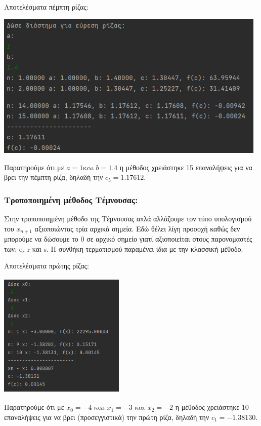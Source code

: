\documentclass{article}
\begin{document}
    \vspace{3mm}
    Αποτελέσματα πέμπτη ρίζας: \\
    \begin{center}\includegraphics[height = 7cm]{images/results_16.png}\end{center}
    Παρατηρούμε ότι με \(a = 1 \text{και } b = 1.4\) η μέθοδος χρειάστηκε 15 επαναλήψεις για να βρει την πέμπτη ρίζα, δηλαδή την \(c_5 = 1.17612\).
    
    \subsubsection{Τροποποιημένη μέθοδος Τέμνουσας:}
    
    Στην τροποποιημένη μέθοδο της Τέμνουσας απλά αλλάζουμε τον τύπο υπολογισμού του \(x_{n+1}\) αξιοποιώντας τρία αρχικά σημεία. Εδώ θέλει λίγη προσοχή καθώς δεν μπορούμε να δώσουμε το 0 σε αρχικό σημείο γιατί αξιοποιείται στους παρονομαστές των: q, r και s. Η συνθήκη τερματισμού παραμένει ίδια με την κλασσική μέθοδο.
    
    \pagebreak
    Αποτελέσματα πρώτης ρίζας: \\
    \begin{center}\includegraphics[width = 6cm, height = 6cm]{images/results_17.png}\end{center}
    Παρατηρούμε ότι με \(x_0 = -4 \text{ και } x_1 = -3 \text{ και } x_2 = -2\) η μέθοδος χρειάστηκε 10 επαναλήψεις για να βρει (προσεγγιστικά) την πρώτη ρίζα, δηλαδή την \(c_1 = -1.38130\).
    
\end{document}
